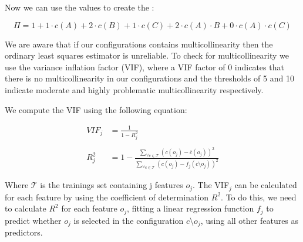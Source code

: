 Now we can use the values to create the \perfInfluenceModel:

\begin{equation}
    \Pi = 1 + 1 \cdot c(A) + 2 \cdot c(B) + 1 \cdot c(C) + 2 \cdot c(A) \cdot B + 0 \cdot c(A) \cdot c(C)
\end{equation}

We are aware that if our configurations contains multicollinearity then the ordinary least squares estimator is unreliable.
To check for multicollinearity we use the variance inflation factor (VIF), where a VIF factor of 0 indicates
that there is no multicollinearity in our configurations and the thresholds of 5 and 10 indicate moderate and highly problematic multicollinearity 
respectively. \cite{Multicollinearity}

We compute the VIF using the following equation:

\begin{align}
    VIF_{j} &= \frac{1}{1 - R^{2}_{j}}  \\ \nonumber\\
    R^{2}_{j} &= 1 - \frac{\sum\limits_{\forall c \in \mathcal{T}} (c(o_j) - \overline{c}(o_j))^2} {\sum\limits_{\forall c \in \mathcal{T}}(c(o_j) - f_j(c \setminus o_j))^2}
\end{align}

Where $\mathcal{T}$ is the trainings set containing j features $o_j$. The VIF$_{j}$ can be calculated for each feature by using the coefficient
of determination $R^2$. To do this, we need to calculate $R^2$ for each feature $o_j$, fitting a linear regression function $f_j$ to predict whether $o_j$
is selected in the configuration $c \setminus o_j$, using all other features as predictors. \cite{Multicollinearity}
